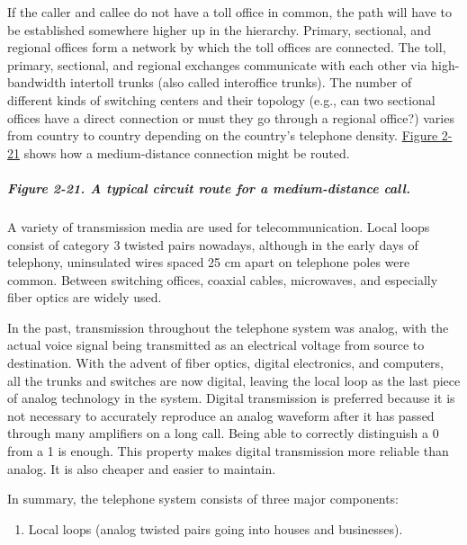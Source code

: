 If the caller and callee do not have a toll office in common, the path
will have to be established somewhere higher up in the hierarchy.
Primary, sectional, and regional offices form a network by which the
toll offices are connected. The toll, primary, sectional, and regional
exchanges communicate with each other via high-bandwidth {intertoll
trunks} (also called {interoffice trunks}). The number of different
kinds of switching centers and their topology (e.g., can two sectional
offices have a direct connection or must they go through a regional
office?) varies from country to country depending on the country's
telephone density.
\protect\hyperlink{0130661023_ch02lev1sec5.htmlux5cux23ch02fig21}{Figure
2-21} shows how a medium-distance connection might be routed.

\subparagraph[Figure 2-21. A typical circuit route for a medium-distance
call.]{\texorpdfstring{\protect\hypertarget{0130661023_ch02lev1sec5.htmlux5cux23ch02fig21}{}{}Figure
2-21. A typical circuit route for a medium-distance
call.}{Figure 2-21. A typical circuit route for a medium-distance call.}}


A variety of transmission media are used for telecommunication. Local
loops consist of category 3 twisted pairs nowadays, although in the
early days of telephony, uninsulated wires spaced 25 cm apart on
telephone poles were common. Between switching offices, coaxial cables,
microwaves, and especially fiber optics are widely used.

In the past, transmission throughout the telephone system was analog,
with the actual voice signal being transmitted as an electrical voltage
from source to destination. With the advent of fiber optics, digital
electronics, and computers, all the trunks and switches are now digital,
leaving the local loop as the last piece of analog technology in the
system. Digital transmission is preferred because it is not necessary to
accurately reproduce an analog waveform after it has passed through many
amplifiers on a long call. Being able to correctly distinguish a 0 from
a 1 is enough. This property makes digital transmission more reliable
than analog. It is also cheaper and easier to maintain.

In summary, the telephone system consists of three major components:

\begin{enumerate}
\def\labelenumi{\arabic{enumi}.}
\item
  {}

  Local loops (analog twisted pairs going into houses and businesses).
\end{enumerate}

